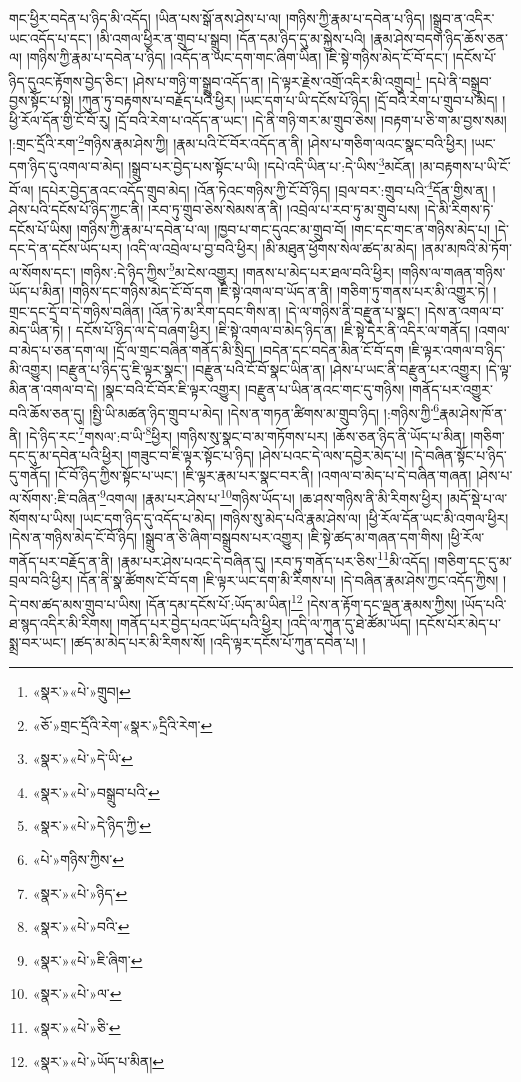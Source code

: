 གང་ཕྱིར་བདེན་པ་ཉིད་མི་འདོད། །ཡིན་པས་སྒོ་ནས་ཤེས་པ་ལ། །གཉིས་ཀྱི་རྣམ་པ་དབེན་པ་ཉིད། །སྒྲུབ་ན་འདིར་ཡང་འདོད་པ་དང་། །མི་འགལ་ཕྱིར་ན་གྲུབ་པ་སྒྲུབ། །དོན་དམ་ཉིད་དུ་མ་སྐྱེས་པའི། །རྣམ་ཤེས་བདག་ཉིད་ཆོས་ཅན་ལ། །གཉིས་ཀྱི་རྣམ་པ་དབེན་པ་ཉིད། །འདོད་ན་ཡང་དག་གང་ཞིག་ཡིན། །ཇི་སྟེ་གཉིས་མེད་ངོ་བོ་དང་། །དངོས་པོ་ཉིད་དུའང་རྟོགས་བྱེད་ཅིང་། །ཤེས་པ་གཉི་ག་སྒྲུབ་འདོད་ན། །དེ་ལྟར་རྗེས་འགྲོ་འདིར་མི་འགྲུབ།\footnote{«སྣར་»«པེ་»གྲུབ།} །དཔེ་ནི་བསྒྲུབ་བྱས་སྟོང་པ་སྟེ། །ཀུན་ཏུ་བརྟགས་པ་བརྗོད་པའི་ཕྱིར། །ཡང་དག་པ་ཡི་དངོས་པོ་ཉིད། །དྲོ་བའི་རེག་པ་གྲུབ་པ་མེད། །ཕྱི་རོལ་དོན་གྱི་ངོ་བོ་རུ། །དྲོ་བའི་རེག་པ་འདོད་ན་ཡང་། །དེ་ནི་གཉི་གར་མ་གྲུབ་ཅེས། །བརྟག་པ་ཅི་ག་མ་བྱས་སམ། །:གྲང་དྲོའི་རག་\footnote{«ཅོ་»གྲང་དྲོའི་རེག་«སྣར་»དྲིའི་རེག་}གཉིས་རྣམ་ཤེས་ཀྱི། །རྣམ་པའི་ངོ་བོར་འདོད་ན་ནི། །ཤེས་པ་གཅིག་ལའང་སྣང་བའི་ཕྱིར། །ཡང་དག་ཉིད་དུ་འགལ་བ་མེད། །སྒྲུབ་པར་བྱེད་པས་སྟོང་པ་ཡི། །དཔེ་འདི་ཡིན་པ་:དེ་ཡིས་\footnote{«སྣར་»«པེ་»དེ་ཡི་}མངོན། །མ་བརྟགས་པ་ཡི་ངོ་བོ་ལ། །དཔེར་བྱེད་ནའང་འདོད་གྲུབ་མེད། །འོན་ཏེའང་གཉིས་ཀྱི་ངོ་བོ་ཉིད། །བྲལ་བར་:གྲུབ་པའི་\footnote{«སྣར་»«པེ་»བསྒྲུབ་པའི་}དོན་གྱིས་ན། །ཤེས་པའི་དངོས་པོ་ཉིད་ཀྱང་ནི། །རབ་ཏུ་གྲུབ་ཅེས་སེམས་ན་ནི། །འབྲེལ་པ་རབ་ཏུ་མ་གྲུབ་པས། །དེ་མི་རིགས་ཏེ་དངོས་པོ་ཡིས། །གཉིས་ཀྱི་རྣམ་པ་དབེན་པ་ལ། །ཁྱབ་པ་གང་དུའང་མ་གྲུབ་བོ། །གང་དང་གང་ན་གཉིས་མེད་པ། །དེ་དང་དེ་ན་དངོས་ཡོད་པར། །འདི་ལ་འབྲེལ་པ་བྱ་བའི་ཕྱིར། །མི་མཐུན་ཕྱོགས་སེལ་ཚད་མ་མེད། །ནམ་མཁའི་མེ་ཏོག་ལ་སོགས་དང་། །གཉིས་:དེ་ཉིད་ཀྱིས་\footnote{«སྣར་»«པེ་»དེ་ཉིད་ཀྱི་}མ་ངེས་འགྱུར། །གནས་པ་མེད་པར་ཐལ་བའི་ཕྱིར། །གཉིས་ལ་གཞན་གཉིས་ཡོད་པ་མིན། །གཉིས་དང་གཉིས་མེད་ངོ་བོ་དག །ཇི་སྟེ་འགལ་བ་ཡོད་ན་ནི། །གཅིག་ཏུ་གནས་པར་མི་འགྱུར་ཏེ། །གྲང་དང་དྲོ་བ་དེ་གཉིས་བཞིན། །འོན་ཏེ་མ་རིག་དབང་གིས་ན། །དེ་ལ་གཉིས་ནི་བརྫུན་པ་སྣང་། །དེས་ན་འགལ་བ་མེད་ཡིན་ཏེ། །
དངོས་པོ་ཉིད་ལ་དེ་བཞག་ཕྱིར། །ཇི་སྟེ་འགལ་བ་མེད་ཉིད་ན། །ཇི་སྟེ་དེར་ནི་འདིར་ལ་གནོད། །འགལ་བ་མེད་པ་ཅན་དག་ལ། །དྲོ་ལ་གྲང་བཞིན་གནོད་མི་སྲིད། །བདེན་དང་བདེན་མིན་ངོ་བོ་དག །ཇི་ལྟར་འགལ་བ་ཉིད་མི་འགྱུར། །བརྫུན་པ་ཉིད་དུ་ཇི་ལྟར་སྣང་། །བརྫུན་པའི་ངོ་བོ་སྣང་ཡིན་ན། །ཤེས་པ་ཡང་ནི་བརྫུན་པར་འགྱུར། །དེ་ལྟ་མིན་ན་འགལ་བ་དེ། །སྣང་བའི་ངོ་བོར་ཇི་ལྟར་འགྱུར། །བརྫུན་པ་ཡིན་ནའང་གང་དུ་གཉིས། །གནོད་པར་འགྱུར་བའི་ཆོས་ཅན་དུ། །སྤྱི་ཡི་མཚན་ཉིད་གྲུབ་པ་མེད། །དེས་ན་གཏན་ཚིགས་མ་གྲུབ་ཉིད། །:གཉིས་ཀྱི་\footnote{«པེ་»གཉིས་ཀྱིས་}རྣམ་ཤེས་ཁོ་ན་ནི། །དེ་ཉིད་རང་\footnote{«སྣར་»«པེ་»ཉིད་}གསལ་:བ་ཡི་\footnote{«སྣར་»«པེ་»བའི་}ཕྱིར། །གཉིས་སུ་སྣང་བ་མ་གཏོགས་པར། །ཆོས་ཅན་ཉིད་ནི་ཡོད་པ་མིན། །གཅིག་དང་དུ་མ་དབེན་པའི་ཕྱིར། །གཟུང་བ་ཇི་ལྟར་སྟོང་པ་ཉིད། །ཤེས་པའང་དེ་ལས་དབྱེར་མེད་པ། །དེ་བཞིན་སྟོང་པ་ཉིད་དུ་གནོད། །ངོ་བོ་ཉིད་ཀྱིས་སྟོང་པ་ཡང་། །ཇི་ལྟར་རྣམ་པར་སྣང་བར་ནི། །འགལ་བ་མེད་པ་དེ་བཞིན་གཞན། །ཤེས་པ་ལ་སོགས་:ཇི་བཞིན་\footnote{«སྣར་»«པེ་»ཇི་ཞིག་}འགལ། །རྣམ་པར་ཤེས་པ་\footnote{«སྣར་»«པེ་»ལ་}གཉིས་ཡོད་པ། །ཆ་ཤས་གཉིས་ནི་མི་རིགས་ཕྱིར། །མདོ་སྡེ་པ་ལ་སོགས་པ་ཡིས། །ཡང་དག་ཉིད་དུ་འདོད་པ་མེད། །གཉིས་སུ་མེད་པའི་རྣམ་ཤེས་ལ། །ཕྱི་རོལ་དོན་ཡང་མི་འགལ་ཕྱིར། །དེས་ན་གཉིས་མེད་ངོ་བོ་ཉིད། །སྒྲུབ་ན་ཅི་ཞིག་བསྒྲུབས་པར་འགྱུར། །ཇི་སྟེ་ཚད་མ་གཞན་དག་གིས། །ཕྱི་རོལ་གནོད་པར་བརྗོད་ན་ནི། །རྣམ་པར་ཤེས་པའང་དེ་བཞིན་དུ། །རབ་ཏུ་གནོད་པར་ཅིས་\footnote{«སྣར་»«པེ་»ཅི་}མི་འདོད། །གཅིག་དང་དུ་མ་བྲལ་བའི་ཕྱིར། །དོན་ནི་སྣ་ཚོགས་ངོ་བོ་དག །ཇི་ལྟར་ཡང་དག་མི་རིགས་པ། །དེ་བཞིན་རྣམ་ཤེས་ཀྱང་འདོད་ཀྱིས། །དེ་བས་ཚད་མས་གྲུབ་པ་ཡིས། །དོན་དམ་དངོས་པོ་:ཡོད་མ་ཡིན།\footnote{«སྣར་»«པེ་»ཡོད་པ་མིན།} །དེས་ན་རྟོག་དང་ལྡན་རྣམས་ཀྱིས། །ཡོད་པའི་ཐ་སྙད་འདིར་མི་རིགས། །གནོད་པར་བྱེད་པའང་ཡོད་པའི་ཕྱིར། །འདི་ལ་ཀུན་དུ་ཐེ་ཚོམ་ཡོད། །དངོས་པོར་མེད་པ་སྨྲ་བར་ཡང་། །ཚད་མ་མེད་པར་མི་རིགས་སོ། །འདི་ལྟར་དངོས་པོ་ཀུན་དབེན་པ། །
